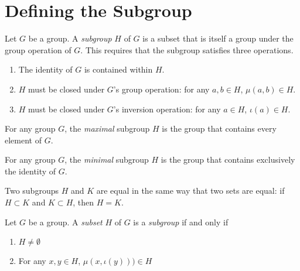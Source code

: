 \section{Defining the Subgroup}

\begin{definition}
    \label{definition : Subgroup}
    \leanok
    Let $G$ be a group. A \textit{subgroup} $H$ of $G$ is a subset that is itself a group under the group operation of $G$. This requires that the subgroup satisfies three operations.

    \begin{enumerate}
        \item The identity of $G$ is contained within $H$.
        \item $H$ must be closed under $G$'s group operation: for any $a,b \in H$, $\mu(a,b) \in H$.
        \item $H$ must be closed under $G$'s inversion operation: for any $a \in H$, $\iota(a) \in H$.
    \end{enumerate}
\end{definition}

\begin{definition}
    \label{definition : Subgroup_Maximal}
    \leanok
    For any group $G$, the \textit{maximal} subgroup $H$ is the group that contains every element of $G$.
\end{definition}

\begin{definition}
    \label{definition : Subgroup_Minimal}
    \leanok
    For any group $G$, the \textit{minimal} subgroup $H$ is the group that contains exclusively the identity of $G$.
\end{definition}

\begin{theorem}
    \label{theorem : Subgroup_ext}
    \leanok
    Two subgroups $H$ and $K$ are equal in the same way that two sets are equal: if $H \subset K$ and $K \subset H$, then $H = K$.
\end{theorem}

\begin{proposition}
    \label{proposition : Subgroup_Criterion}
    \leanok
    Let $G$ be a group. A \textit{subset} $H$ of $G$ is a \textit {subgroup} if and only if
    \begin{enumerate}
        \item $H \neq \emptyset$
        \item For any $x, y \in H$, $\mu(x, \iota (y))) \in H$
    \end{enumerate}
\end{proposition}

